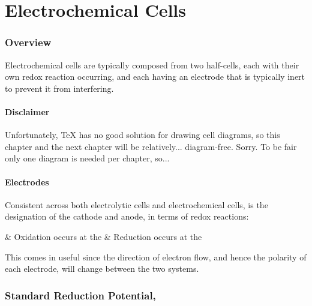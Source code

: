 

\pagebreak
\part{Electrochemical Cells}

	\section{Overview}

		Electrochemical cells are typically composed from two half-cells, each with their own redox reaction occurring, and each having an
		electrode that is typically inert to prevent it from interfering.

		\subsection{Disclaimer}

			Unfortunately, \TeX{} has no good solution for drawing cell diagrams, so this chapter and the next chapter will be relatively...
			diagram-free. Sorry. To be fair only one diagram is needed per chapter, so...



		\subsection{Electrodes}

			Consistent across both electrolytic cells and electrochemical cells, is the designation of the cathode and anode, in terms of
			redox reactions:

			\begin{bulletlist}
				& Oxidation occurs at the 
				& Reduction occurs at the 
			\end{bulletlist}

			This comes in useful since the direction of electron flow, and hence the polarity of each electrode, will change between the two
			systems.




	\pagebreak
	\section{Standard Reduction Potential, \MEo{}}

